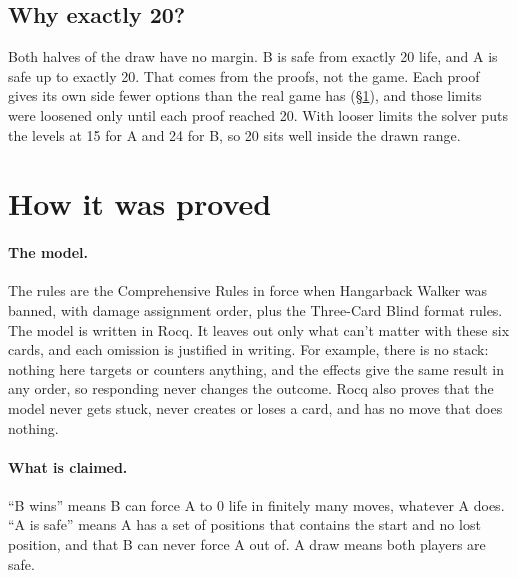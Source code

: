 \documentclass[11pt]{article}
\newcommand{\Walker}{Hangarback Walker}
\begin{document}
\subsection{Why exactly 20?}
\label{sec:open}
Both halves of the draw have no margin. B is safe from exactly 20 life,
and A is safe up to exactly 20. That comes from the proofs, not the game.
Each proof gives its own side fewer options than the real game has
(\S\ref{sec:proof}), and those limits were loosened only until each
proof reached 20. With looser limits the solver puts the levels at 15
for A and 24 for B, so 20 sits well inside the drawn range.

\section{How it was proved}
\label{sec:proof}

\paragraph{The model.} The rules are the Comprehensive Rules in force
when \Walker{} was banned, with damage assignment order, plus the
Three-Card Blind format rules. The model is written in Rocq. It leaves
out only what can't matter with these six cards, and each omission is
justified in writing. For example, there is no stack: nothing here
targets or counters anything, and the effects give the same result in any
order, so responding never changes the outcome. Rocq also proves that
the model never gets stuck, never creates or loses a card, and has no
move that does nothing.

\paragraph{What is claimed.} ``B wins'' means B can force A to 0 life in
finitely many moves, whatever A does. ``A is safe'' means A has a set of
positions that contains the start and no lost position, and that B can
never force A out of. A draw means both players are safe.
\end{document}
